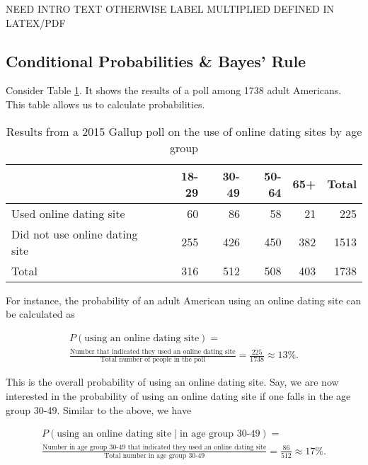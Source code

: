 \documentclass[]{book}
\theoremstyle{definition}
\theoremstyle{definition}
\theoremstyle{remark}
\begin{document}
NEED INTRO TEXT OTHERWISE LABEL MULTIPLIED DEFINED IN LATEX/PDF

\subsection{Conditional Probabilities \& Bayes'
Rule}\label{sec:bayes-rule}

Consider Table \ref{tab:2015gallupDating}. It shows the results of a
poll among 1738 adult Americans. This table allows us to calculate
probabilities.

\begin{table}

\caption{\label{tab:2015gallupDating}Results from a 2015 Gallup poll on the use of online dating sites by age group}
\centering
\begin{tabular}[t]{lrrrrr}
\toprule
  & 18-29 & 30-49 & 50-64 & 65+ & Total\\
\midrule
Used online dating site & 60 & 86 & 58 & 21 & 225\\
Did not use online dating site & 255 & 426 & 450 & 382 & 1513\\
Total & 316 & 512 & 508 & 403 & 1738\\
\bottomrule
\end{tabular}
\end{table}

For instance, the probability of an adult American using an online
dating site can be calculated as

\begin{multline*}
    P(\text{using an online dating site}) = \\
    \frac{\text{Number that indicated they used an online dating site}}{\text{Total number of people in the poll}}
    = \frac{225}{1738} \approx 13\%.
\end{multline*}

This is the overall probability of using an online dating site. Say, we
are now interested in the probability of using an online dating site if
one falls in the age group 30-49. Similar to the above, we have

\begin{multline*}
    P(\text{using an online dating site} \mid \text{in age group 30-49}) = \\
    \frac{\text{Number in age group 30-49 that indicated they used an online dating site}}{\text{Total number in age group 30-49}}
    = \frac{86}{512} \approx 17\%.
\end{multline*}
\end{document}
